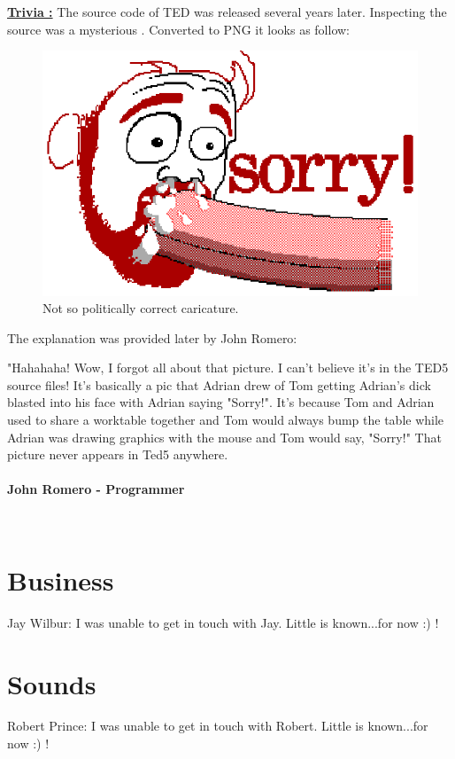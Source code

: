 \documentclass[book.tex]{subfiles}
\begin{document}
 \textbf{\underline{Trivia :}} The source code of TED was released several years later. Inspecting the source was a mysterious . Converted to PNG it looks as follow:\\
\begin{figure}[H]
\centering
 \includegraphics[scale=1.5]{imgs/_tom.eps}
 \caption{Not so politically correct caricature.} \label{fig:mips}
 \end{figure}
The explanation was provided later by John Romero:\\
 \begin{fancyquotes}
   "Hahahaha! Wow, I forgot all about that picture. I can't believe it's 
in the TED5 source files! It's basically a pic that Adrian drew of Tom 
getting Adrian's dick blasted into his face with Adrian saying "Sorry!". 
It's because Tom and Adrian used to share a worktable together and Tom 
would always bump the table while Adrian was drawing graphics with the 
mouse and Tom would say, "Sorry!" That picture never appears in Ted5 
anywhere.\\
   \\
\textbf{John Romero - Programmer}
 \end{fancyquotes}\\



\section{Business}
Jay Wilbur: I was unable to get in touch with Jay. Little is known...for now :) !\\
\section{Sounds}
Robert Prince: I was unable to get in touch with Robert. Little is known...for now :) !\\
\end{document}
